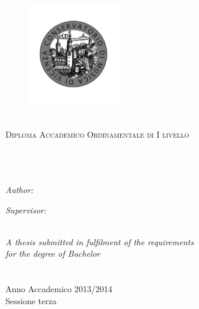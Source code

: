 \documentclass[11pt, oneside]{Thesis} %
\begin{document}
\begin{titlepage}
\begin{center}
\begin{figure}[htbp]
\begin{center}
\includegraphics[width=4cm]{Figures/logo.png}
\end{center}
\end{figure}

\textsc{\LARGE \univname}\\[1.0cm] %
\textsc{\Large Diploma Accademico Ordinamentale di I livello}\\[0.3cm] %

\HRule \\[0.4cm] %
{\huge \bfseries \ttitle}\\[0.5cm] %
\HRule \\[0.4cm] %
 
\begin{minipage}{0.4\textwidth}
\begin{flushleft} \large
\emph{Author:}\\
\href{http://www.johnsmith.com}{\authornames} %
\end{flushleft}
\end{minipage}
\begin{minipage}{0.4\textwidth}
\begin{flushright} \large
\emph{Supervisor:} \\
\href{http://www.jamessmith.com}{\supname} %
\end{flushright}
\end{minipage}\\[2cm]
 
\large \textit{A thesis submitted in fulfilment of the requirements\\ for the degree of Bachelor}\\[0.6cm] %

\groupname\\\deptname\\[2cm] %
 
\large Anno Accademico 2013/2014 \\ Sessione terza
 
\vfill
\end{center}

\end{titlepage}
\end{document}
